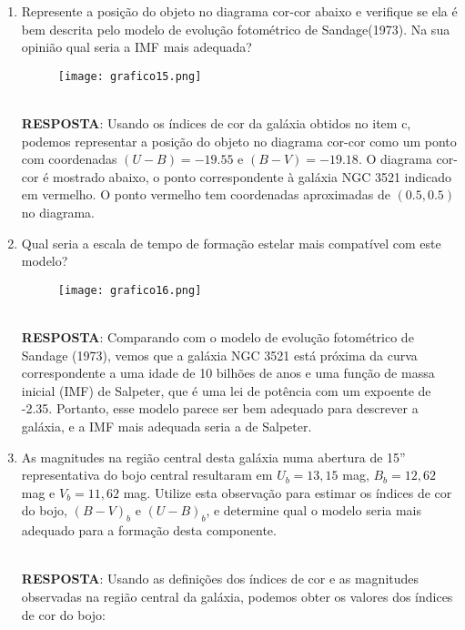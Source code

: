 \documentclass[a4paper,12pt]{article}
\begin{document}
\begin{enumerate}
\begin{enumerate}
\noindent\hrulefill

\item Represente a posição do objeto no diagrama cor-cor abaixo e verifique se ela é bem descrita pelo modelo de evolução fotométrico de Sandage(1973). Na sua opinião qual seria a IMF mais adequada?

\begin{figure}[H]
\centering
\texttt{[image: grafico15.png]}
\end{figure}

\noindent\hrulefill\\\textbf{RESPOSTA}: Usando os índices de cor da galáxia obtidos no item c, podemos representar a posição do objeto no diagrama cor-cor como um ponto com coordenadas $(U-B)=-19.55$ e $(B-V)=-19.18$. O diagrama cor-cor é mostrado abaixo, o ponto correspondente à galáxia NGC 3521 indicado em vermelho. O ponto vermelho tem coordenadas aproximadas de $(0.5, 0.5)$ no diagrama.

\noindent\hrulefill

\item Qual seria a escala de tempo de formação estelar mais compatível com este modelo?

\begin{figure}[H]
\centering
\texttt{[image: grafico16.png]}
\end{figure}

\noindent\hrulefill\\\textbf{RESPOSTA}: Comparando com o modelo de evolução fotométrico de Sandage (1973), vemos que a galáxia NGC 3521 está próxima da curva correspondente a uma idade de 10 bilhões de anos e uma função de massa inicial (IMF) de Salpeter, que é uma lei de potência com um expoente de -2.35. Portanto, esse modelo parece ser bem adequado para descrever a galáxia, e a IMF mais adequada seria a de Salpeter.

\noindent\hrulefill

\item As magnitudes na região central desta galáxia numa abertura de 15” representativa do bojo central resultaram em $U_b=13,15$ mag, $B_b=12,62$ mag e $V_b=11,62$ mag. Utilize esta observação para estimar os índices de cor do bojo, $(B-V)_b$ e $(U-B)_b$, e determine qual o modelo seria mais adequado para a formação desta componente.

\noindent\hrulefill\\\textbf{RESPOSTA}: Usando as definições dos índices de cor e as magnitudes observadas na região central da galáxia, podemos obter os valores dos índices de cor do bojo:


\end{enumerate}
\end{enumerate}
\end{document}
